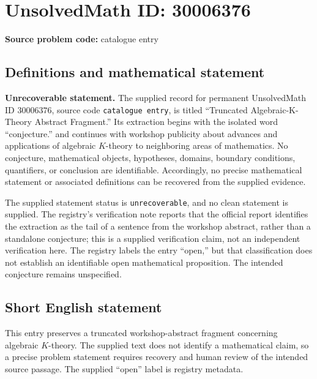 \documentclass[11pt]{article}
\begin{document}
\section*{UnsolvedMath ID: 30006376}
\textbf{Source problem code:} catalogue entry
\subsection{Definitions and mathematical statement}
\textbf{Unrecoverable statement.} The supplied record for permanent UnsolvedMath ID \(30006376\), source code \texttt{catalogue entry}, is titled ``Truncated Algebraic-K-Theory Abstract Fragment.'' Its extraction begins with the isolated word ``conjecture.'' and continues with workshop publicity about advances and applications of algebraic \(K\)-theory to neighboring areas of mathematics. No conjecture, mathematical objects, hypotheses, domains, boundary conditions, quantifiers, or conclusion are identifiable. Accordingly, no precise mathematical statement or associated definitions can be recovered from the supplied evidence.

The supplied statement status is \texttt{unrecoverable}, and no clean statement is supplied. The registry's verification note reports that the official report identifies the extraction as the tail of a sentence from the workshop abstract, rather than a standalone conjecture; this is a supplied verification claim, not an independent verification here. The registry labels the entry ``open,'' but that classification does not establish an identifiable open mathematical proposition. The intended conjecture remains unspecified.
\subsection{Short English statement}
This entry preserves a truncated workshop-abstract fragment concerning algebraic \(K\)-theory. The supplied text does not identify a mathematical claim, so a precise problem statement requires recovery and human review of the intended source passage. The supplied ``open'' label is registry metadata.
\end{document}
